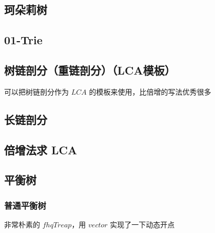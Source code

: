 \documentclass[12pt]{article}
\begin{document}
\newpage

\subsection{珂朵莉树}



\newpage

\subsection{01-Trie}



\newpage

\subsection{树链剖分（重链剖分）（LCA模板）}

可以把树链剖分作为 $LCA$ 的模板来使用，比倍增的写法优秀很多



\subsection{长链剖分}



\newpage

\subsection{倍增法求 LCA}



\newpage

\subsection{平衡树}

\subsubsection{普通平衡树}

非常朴素的 $fhqTreap$，用 $vector$ 实现了一下动态开点
\end{document}

